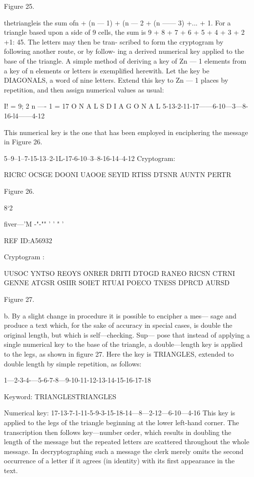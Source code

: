  

Figure 25.

thetriangleis the sum ofn + (n — 1) + (n — 2 + (n —— 3) +...
+ 1. For a triangle based upon a side of 9 cells, the sum is 9 + 8 + 7
+ 6 + 5 + 4 + 3 + 2 +1: 45. The letters may then be tran-
scribed to form the cryptogram by following another route, or by follow-
ing a derived numerical key applied to the base of the triangle. A simple
method of deriving a key of Zn — 1 elements from a key of n elements
or letters is exempliﬁed herewith. Let the key be DIAGONALS, a word
of nine letters. Extend this key to Zn — 1 places by repetition, and then
assign numerical values as usual:

I! = 9; 2 n —- 1 = 17
O N A L S D I A G O N A L
5-13-2-11-17——6-10—3—8-16-l4——4-12

This numerical key is the one that has been employed in enciphering
the message in Figure 26.

 

 

5--9--1--7-15-13--2-1L-17-6-10--3--8-16-14--4-12
Cryptogram:

RICRC OCSGE DOONI UAOOE
SEYID RTISS DTSNR AUNTN
PERTR

Figure 26.

8‘2

 

ﬁver—'M -"-"" ' ' " '

REF ID:A56932

 

 

Cryptogram :

UUSOC YNTSO REOYS ONRER
DRITI DTOGD RANEO RICSN
CTRNI GENNE ATGSR OSIIR
SOIET RTUAI POECO TNESS
DPRCD AURSD

Figure 27.

b. By a slight change in procedure it is possible to encipher a mes—
sage and produce a text which, for the sake of accuracy in special
cases, is double the original length, but which is self—checking. Sup—
pose that instead of applying a single numerical key to the base of the
triangle, a double—length key is applied to the legs, as shown in
ﬁgure 27. Here the key is TRIANGLES, extended to double length
by simple repetition, as follows:

1—2-3-4-—5-6-7-8—9-10-11-12-13-14-15-16-17-18

Keyword: TRIANGLESTRIANGLES

Numerical key: 17-13-7-1-11-5-9-3-15-18-14—8—2-12—6-10—4-16
This key is applied to the legs of the triangle beginning at the lower
left-hand corner. The transcription then follows key—number order,
which results in doubling the length of the message but the repeated
letters are scattered throughout the whole message. In decryptographing
such a message the clerk merely omits the second occurrence of a letter
if it agrees (in identity) with its ﬁrst appearance in the text.


